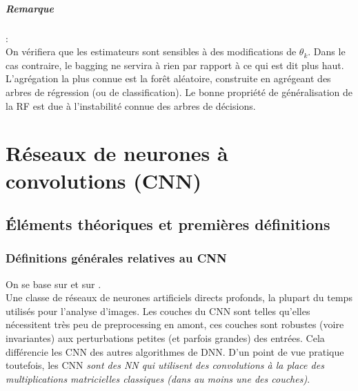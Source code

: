 \documentclass[a4paper,12pt]{report}
\newcommand\bk{\color{black}}
\newcommand\brick{\color{brick}}
\newcommand\navy{\color{navy}}
\numberwithin{equation}{section} %
\begin{document}
\paragraph*{Remarque }:\\
On vérifiera que les estimateurs sont sensibles à des modifications de $\theta_k$. Dans le cas contraire, le bagging ne servira à rien par rapport à ce qui est dit plus haut. \\
 L'agrégation la plus connue est la forêt aléatoire, construite en agrégeant des arbres de régression (ou de classification). Le bonne propriété de généralisation de la RF est due à l'instabilité connue des arbres de décisions.

\newpage

\navy \chapter{Réseaux de neurones à convolutions (CNN)} \bk
\section{Éléments théoriques et premières définitions}
\brick \subsection{Définitions générales relatives au CNN} \bk
On se base sur \citep{nielsen2015neural} et sur \citep{Goodfellow-et-al-2016}.\\
Une classe de réseaux de neurones artificiels directs profonds, la plupart du temps utilisés pour l'analyse d'images. Les couches du CNN sont telles qu'elles nécessitent très peu de preprocessing en amont, ces couches sont robustes (voire invariantes) aux perturbations petites (et parfois grandes) des entrées. Cela différencie les CNN des autres algorithmes de DNN. 
D'un point de vue pratique toutefois, les CNN \textit{sont des NN qui utilisent des convolutions à la place des multiplications matricielles classiques (dans au moins une des couches)}.
\end{document}
